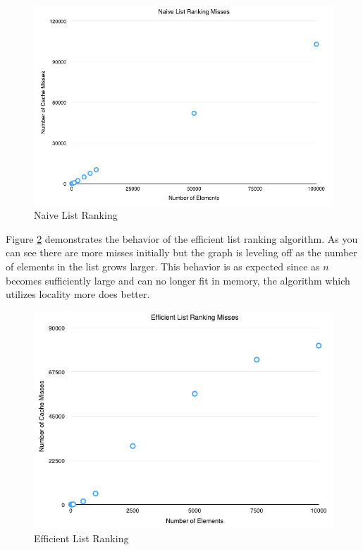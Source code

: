 \documentclass[11pt]{article}
\begin{document}
\begin{figure}[H]  
\includegraphics[scale=0.5]{figures/NaiveListRanking.png}
\caption{Naive List Ranking}
\label{naivelistranking}
\end{figure}

Figure \ref{efficientlistranking}  demonstrates the behavior of the efficient list ranking algorithm. As you can see there are more misses initially but the graph is leveling off as the number of elements in the list grows larger.  This behavior is 
as expected since as $n$ becomes sufficiently large and can no longer fit in memory, the algorithm which utilizes locality more does better.

\begin{figure}[H]  
\includegraphics[scale=0.5]{figures/EfficientListRanking.png}
\caption{Efficient List Ranking}
\label{efficientlistranking}
\end{figure}
\end{document}
